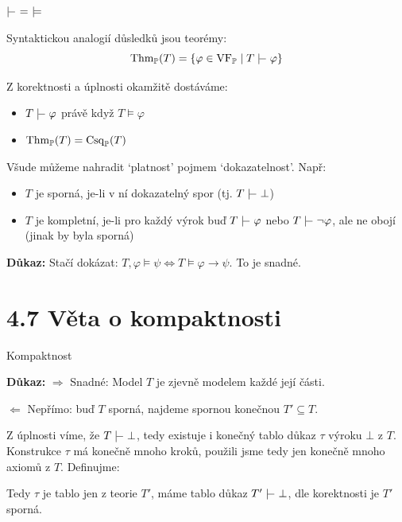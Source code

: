 \documentclass{beamer}
\begin{document}
\begin{frame}{$\proves\ =\ \models$}

    \pause
    Syntaktickou analogií \alert{důsledků} jsou \alert{teorémy}:
    $$\Thm_\mathbb P(T)=\{\varphi\in\VF_\mathbb P\mid T\proves\varphi\}$$
    
    \pause
    Z korektnosti a úplnosti okamžitě dostáváme:
        \begin{itemize}
            \item $T\proves\varphi$ právě když $T\models\varphi$
            \item $\operatorname{Thm}_\mathbb P(T)=\operatorname{Csq}_\mathbb P(T)$
        \end{itemize}
    
        \pause
    Všude můžeme nahradit `\alert{platnost}' pojmem `\alert{dokazatelnost}'.  Např:\pause
    \begin{itemize}
        \item $T$ je \alert{sporná}, je-li v ní dokazatelný spor (tj. \alert{$T\proves\bot$})\pause
        \item $T$ je \alert{kompletní}, je-li pro každý výrok buď $T\proves\varphi$ nebo $T\proves\neg\varphi$, ale ne obojí (jinak by byla sporná)
    \end{itemize}

    \pause

    \pause
    \textbf{Důkaz:} Stačí dokázat: $T,\varphi\models\psi\Leftrightarrow T\models\varphi\to\psi$. To je snadné.\hfill\qedsymbol

\end{frame}


\section{4.7 Věta o kompaktnosti}


\begin{frame}{Kompaktnost}

    \smallskip

    \pause
    \textbf{Důkaz:} \pause \alert{$\Rightarrow$ Snadné:} Model $T$ je zjevně modelem každé její části.
    
    \pause
    \alert{$\Leftarrow$ Nepřímo:} buď $T$ sporná, najdeme spornou konečnou $T'\subseteq T$.

    \pause
    Z \alert{úplnosti} víme, že $T\proves\bot$, tedy existuje i \alert{konečný} tablo důkaz $\tau$ výroku $\bot$ z $T$. \pause Konstrukce $\tau$ má konečně mnoho kroků, použili jsme tedy jen konečně mnoho axiomů z $T$. \pause Definujme:
    
    \pause

    \pause
    Tedy $\tau$ je tablo jen z teorie $T'$, máme tablo důkaz $T'\proves\bot$, dle \alert{korektnosti} je $T'$ sporná.\hfill\qedsymbol

\end{frame}
\end{document}

